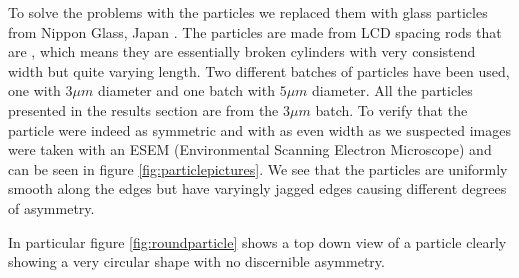 To solve the problems with the particles we replaced them with glass particles from Nippon Glass, Japan \cite{Particles}. The particles are made from LCD spacing rods that are , which means they are essentially broken cylinders with very consistend width but quite varying length. Two different batches of particles have been used, one with $3\mu m$ diameter and one batch with $5 \mu m$ diameter. All the particles presented in the results section are from the $3 \mu m$ batch. To verify that the particle were indeed as symmetric and with as even width as we suspected images were taken with an ESEM (Environmental Scanning Electron Microscope) and can be seen in figure \ref{fig:particlepictures}. We see that the particles are uniformly smooth along the edges but have varyingly jagged edges causing different degrees of asymmetry. 

In particular figure \ref{fig:roundparticle} shows a top down view of a particle clearly showing a very circular shape with no discernible asymmetry.


